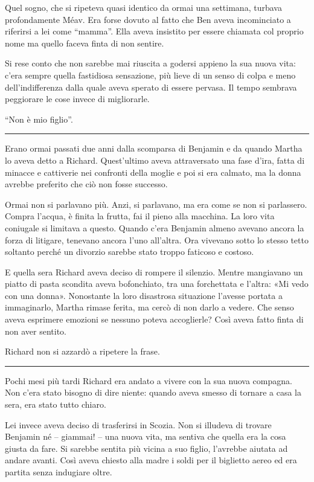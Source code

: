 \documentclass[a4paper,11pt,oneside,openright,final]{memoir}
\begin{document}
Quel sogno, che si ripeteva quasi identico da ormai una settimana, turbava
profondamente Méav. Era forse dovuto al fatto che Ben aveva incominciato a
riferirsi a lei come ``mamma''. Ella aveva insistito per essere chiamata col
proprio nome ma quello faceva finta di non sentire.

Si rese conto che non sarebbe mai riuscita a godersi appieno la sua nuova vita:
c'era sempre quella fastidiosa sensazione, più lieve di un senso di colpa e
meno dell'indifferenza dalla quale aveva sperato di essere pervasa. Il tempo
sembrava peggiorare le cose invece di migliorarle.

``Non è mio figlio''.

\plainbreak{1}

Erano ormai passati due anni dalla scomparsa di Benjamin e da quando Martha lo
aveva detto a Richard. Quest'ultimo aveva attraversato una fase d'ira, fatta di
minacce e cattiverie nei confronti della moglie e poi si era calmato, ma la
donna avrebbe preferito che ciò non fosse successo.

Ormai non si parlavano più. Anzi, si parlavano, ma era come se non si
parlassero. Compra l'acqua, è finita la frutta, fai il pieno alla macchina. La
loro vita coniugale si limitava a questo. Quando c'era Benjamin almeno avevano
ancora la forza di litigare, tenevano ancora l'uno all'altra. Ora vivevano sotto
lo stesso tetto soltanto perché un divorzio sarebbe stato troppo faticoso e
costoso.

E quella sera Richard aveva deciso di rompere il silenzio. Mentre mangiavano un
piatto di pasta scondita aveva bofonchiato, tra una forchettata e l'altra: «Mi
vedo con una donna». Nonostante la loro disastrosa situazione l'avesse portata
a immaginarlo, Martha rimase ferita, ma cercò di non darlo a vedere. Che senso
aveva esprimere emozioni se nessuno poteva accoglierle? Così aveva fatto finta
di non aver sentito.

Richard non si azzardò a ripetere la frase.

\plainbreak{1}

Pochi mesi più tardi Richard era andato a vivere con la sua nuova compagna. Non
c'era stato bisogno di dire niente: quando aveva smesso di tornare a casa la
sera, era stato tutto chiaro.

Lei invece aveva deciso di trasferirsi in Scozia. Non si illudeva di trovare
Benjamin né -- giammai! -- una nuova vita, ma sentiva che quella era la cosa
giusta da fare. Si sarebbe sentita più vicina a suo figlio, l'avrebbe aiutata
ad andare avanti. Così aveva chiesto alla madre i soldi per il biglietto aereo
ed era partita senza indugiare oltre.
\end{document}
